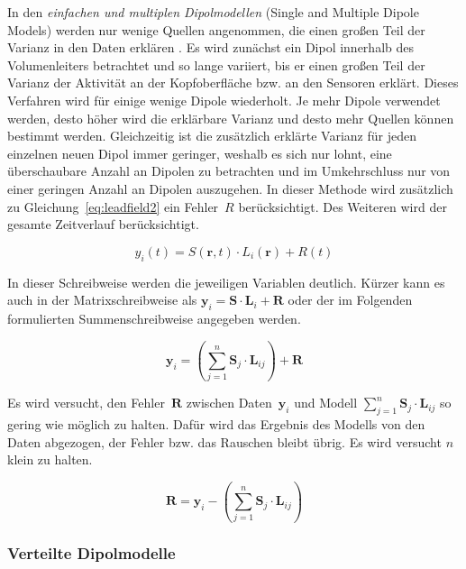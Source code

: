 \documentclass[doc,a4paper,12pt]{apa6}
\newcommand{\mx}[1]{\mathbf{#1}}
\begin{document}
In den \emph{einfachen und multiplen Dipolmodellen} (Single and Multiple Dipole Models) werden nur wenige Quellen angenommen, die einen großen Teil der Varianz in den Daten erklären \parencite{scherg1990fundamentals}. Es wird zunächst ein Dipol innerhalb des Volumenleiters betrachtet und so lange variiert, bis er einen großen Teil der Varianz der Aktivität an der Kopfoberfläche bzw. an den Sensoren erklärt. Dieses Verfahren wird für einige wenige Dipole wiederholt. Je mehr Dipole verwendet werden, desto höher wird die erklärbare Varianz und desto mehr Quellen können bestimmt werden. Gleichzeitig ist die zusätzlich erklärte Varianz für jeden einzelnen neuen Dipol immer geringer, weshalb es sich nur lohnt, eine überschaubare Anzahl an Dipolen zu betrachten und im Umkehrschluss nur von einer geringen Anzahl an Dipolen auszugehen. In dieser Methode wird zusätzlich zu Gleichung~\ref{eq:leadfield2} ein Fehler~$R$ berücksichtigt. Des Weiteren wird der gesamte Zeitverlauf berücksichtigt.

\begin{equation}
\label{eq:leadfield-error}
y_i(t) = S(\mx{r},t) \cdot L_i(\mx{r}) + R(t)
\end{equation}

In dieser Schreibweise werden die jeweiligen Variablen deutlich. Kürzer kann es auch in der Matrixschreibweise als $\mx{y}_i = \mx{S} \cdot \mx{L}_i + \mx{R}$ oder der im Folgenden formulierten Summenschreibweise angegeben werden.

\begin{equation}
\label{eq:leadfield-error-sum}
\mx{y}_i = \left( \sum_{j=1}^n \mx{S}_j \cdot \mx{L}_{ij} \right) + \mx{R}
\end{equation}

Es wird versucht, den Fehler~$\mx{R}$ zwischen Daten~$\mx{y}_i$ und Modell $\sum_{j=1}^n \mx{S}_j \cdot \mx{L}_{ij}$ so gering wie möglich zu halten. Dafür wird das Ergebnis des Modells von den Daten abgezogen, der Fehler bzw. das Rauschen bleibt übrig. Es wird versucht $n$ klein zu halten.

\begin{equation}
\mx{R} = \mx{y}_i - \left( \sum_{j=1}^n \mx{S}_j \cdot \mx{L}_{ij} \right)
\end{equation}

\vspace*{5mm}

\subsubsection{Verteilte Dipolmodelle}
\end{document}
